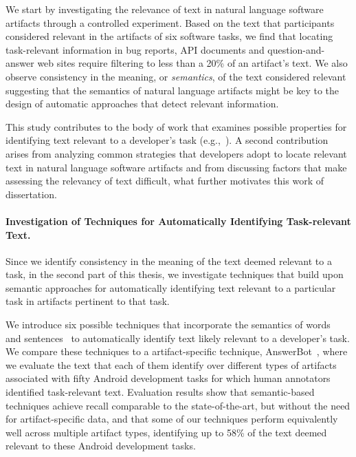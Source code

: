 We start by investigating the relevance of text in natural language software artifacts
through a controlled experiment.
Based on the text that participants considered relevant in the artifacts of six software tasks,
we find that 
locating task-relevant information in bug
reports, API documents and question-and-answer web sites require filtering
to less than a 20\% of an artifact's text.
We also 
observe consistency in the meaning, or \textit{semantics}, of the
 text considered relevant
 suggesting that the semantics of natural language artifacts might 
 be key to the design of automatic approaches that detect relevant information.





This study contributes to the body of work that examines possible properties for identifying text relevant to a developer's task (e.g.,~\cite{Forward2002, Jiang2016b, Robillard2015, Bavota2016}).
A second contribution arises from analyzing
common strategies that developers adopt to locate relevant text
in natural language software artifacts 
and from discussing
factors that make assessing the relevancy of text difficult,
what further motivates this work of dissertation.






\paragraph{\textbf{Investigation of Techniques for Automatically Identifying Task-relevant Text.}} 


Since we identify consistency in the meaning of the text deemed relevant to a task, 
in the second part of this thesis, we investigate
techniques that build upon semantic approaches 
for automatically identifying text relevant to a particular task in artifacts pertinent to that task.


We introduce six possible techniques that incorporate the semantics of words~\cite{Mikolov2013, Devlin2018Bert}
and sentences~\cite{fillmore1976frame, marques2021}
to automatically identify text likely relevant to a developer's task.
We compare these techniques to a artifact-specific technique, AnswerBot~\cite{Xu2017},
where we evaluate the text that each of them identify
 over different types of artifacts
associated with fifty Android development tasks 
for which human annotators identified task-relevant text.
Evaluation results show that semantic-based techniques
achieve recall comparable to the state-of-the-art, but without the need for artifact-specific data,
and that some of our techniques perform equivalently well across
multiple artifact types, identifying up to 58\%
of the text 
deemed relevant to these Android development tasks.



